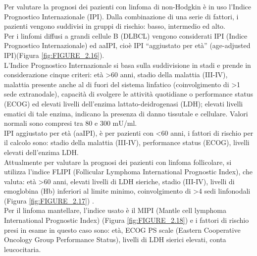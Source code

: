 Per valutare la prognosi dei pazienti con linfoma di non-Hodgkin è in uso l’Indice Prognostico Internazionale (IPI). 
Dalla combinazione di una serie di fattori, i pazienti vengono suddivisi in gruppi di rischio: basso, intermedio 
ed alto\cite{AIOM}.\\ 
Per i linfomi diffusi a grandi cellule B (DLBCL) vengono considerati IPI (Indice Prognostico Internazionale) ed aaIPI, 
cioè IPI “aggiustato per età” (age-adjusted IPI)(Figura \ref{fig:FIGURE_2.16}).\\
L’Indice Prognostico Internazionale si basa sulla suddivisione in stadi e prende in considerazione cinque criteri: 
età >60 anni, stadio della malattia (III-IV), malattia presente anche al di fuori del sistema linfatico 
(coinvolgimento di >1 sede extranodale), capacità di svolgere le attività quotidiane o performance status (ECOG)
ed elevati livelli dell’enzima lattato-deidrogenasi (LDH); elevati livelli ematici di tale enzima,
indicano la presenza di danno tissutale e cellulare. Valori normali sono compresi tra 80 e 300 mU/ml\cite{AIOM}.\\ 
IPI aggiustato per età (aaIPI), è per pazienti con <60 anni, i fattori di rischio per il calcolo sono: 
stadio della malattia (III-IV), performance status (ECOG), livelli elevati dell’enzima LDH.\\
Attualmente per valutare la prognosi dei pazienti con linfoma follicolare, si utilizza l’indice FLIPI 
(Follicular Lymphoma International Prognostic Index), che valuta: 
età >60 anni, elevati livelli di LDH sieriche, stadio (III-IV), livelli di emoglobina (Hb) inferiori al limite minimo, 
coinvolgimento di >4 sedi linfonodali (Figura \ref{fig:FIGURE_2.17}) \cite{AIOM}.\\
Per il linfoma mantellare, l’indice usato è il MIPI (Mantle cell lymphoma International Prognostic Index) 
(Figura \ref{fig:FIGURE_2.18}) e i fattori di rischio presi in esame in questo caso sono: età, ECOG PS scale 
(Eastern Cooperative Oncology Group Performance Status), livelli di LDH sierici elevati, conta leucocitaria\cite{MIPI}.

